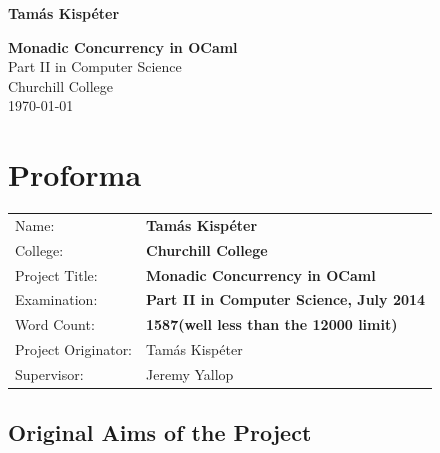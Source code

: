 \documentclass[12pt,twoside,notitlepage]{report}
\begin{document}





\pagestyle{empty}

\hfill{\LARGE \bf Tam\'as Kisp\'eter}

\vspace*{60mm}
\begin{center}
\Huge
{\bf Monadic Concurrency in OCaml} \\
\vspace*{5mm}
Part II in Computer Science \\
\vspace*{5mm}
Churchill College \\
\vspace*{5mm}
\today  %
\end{center}

\cleardoublepage


\setcounter{page}{1}
\pagestyle{plain}

\chapter*{Proforma}

{\large
\begin{tabular}{ll}
Name:               & \bf Tam\'as Kisp\'eter                     \\
College:            & \bf Churchill College                     \\
Project Title:      & \bf Monadic Concurrency in OCaml \\
Examination:        & \bf Part II in Computer Science, July 2014        \\
Word Count:         & \bf 1587\footnotemark[1]
(well less than the 12000 limit) \\
Project Originator: & Tam\'as Kisp\'eter                    \\
Supervisor:         & Jeremy Yallop                    \\ 
\end{tabular}
}


\section*{Original Aims of the Project}
\end{document}
